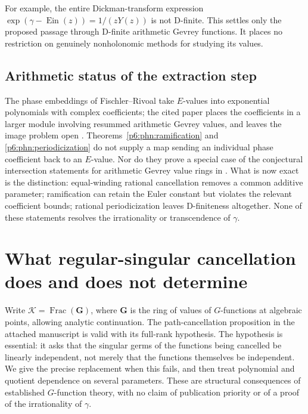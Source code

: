 \documentclass[11pt,a4paper]{article}
\theoremstyle{definition}
\theoremstyle{remark}
\numberwithin{equation}{section}
\begin{document}
For example, the entire Dickman-transform expression
$\exp(\gamma-\operatorname{Ein}(z))=1/(zY(z))$ is not D-finite.
This settles only the proposed passage through D-finite arithmetic
Gevrey functions.  It places no restriction on genuinely
nonholonomic methods for studying its values.

\subsection{Arithmetic status of the extraction step}

The phase embeddings of Fischler--Rivoal take $E$-values into
exponential polynomials with complex coefficients; the cited paper
places the coefficients in a larger module involving resummed
arithmetic Gevrey values, and leaves the image problem open
\cite[Proposition~3.1 and \S6]{p6:FR2026}.
Theorems~\ref{p6:phn:ramification} and \ref{p6:phn:periodicization} do not
supply a map sending an individual phase coefficient back to an
$E$-value.  Nor do they prove a special case of the conjectural
intersection statements for arithmetic Gevrey value rings in
\cite{p6:FischlerRivoal2024Gevrey}.  What is now exact is the distinction:
equal-winding rational cancellation removes a common additive
parameter; ramification can retain the Euler constant but violates
the relevant coefficient bounds; rational periodicization leaves
D-finiteness altogether.  None of these statements resolves the
irrationality or transcendence of $\gamma$.


\section{What regular-singular cancellation does and does not determine}
\label{p6:sec:holonomy-scope}

Write $\mathcal K=\operatorname{Frac}(\mathbf G)$, where $\mathbf G$
is the ring of values of $G$-functions at algebraic points, allowing
analytic continuation.  The path-cancellation proposition in the
attached manuscript is valid with its full-rank hypothesis.  The
hypothesis is essential: it asks that the singular germs of the
functions being cancelled be linearly independent, not merely that
the functions themselves be independent.  We give the precise
replacement when this fails, and then treat polynomial and quotient
dependence on several parameters.  These are structural consequences
of established $G$-function theory, with no claim of publication
priority or of a proof of the irrationality of $\gamma$.
\end{document}
